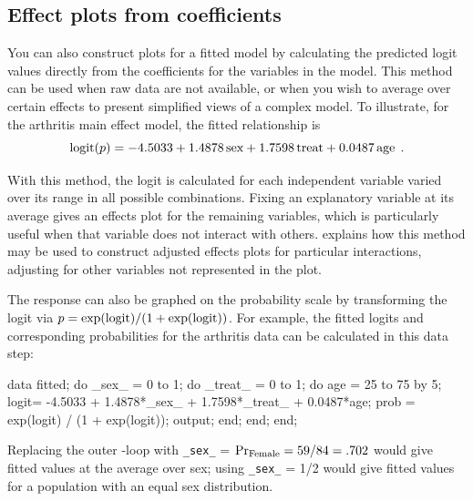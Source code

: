 \subsection{Effect plots from coefficients}\label{sec:logistic-effplot}
You can also construct plots for a fitted model
by calculating the predicted logit values directly from
the coefficients for the variables in the model.
This method can be used when raw data are not available, or when you
wish to average over certain effects to present simplified views of
a complex model.
To illustrate, for the arthritis
main effect model, the fitted relationship is
\begin{equation*}
  \logit ( p )  =
  - 4.5033  +
  1.4878 \,  \mbox{sex}   +
  1.7598 \,  \mbox{treat}  +
  0.0487 \,  \mbox{age}
  \period
\end{equation*}

With this method, the logit is calculated for each independent variable varied over its
range in all possible combinations.
Fixing an explanatory variable at its average gives an
effects plot for the remaining variables, which is particularly
useful when that
variable does not interact with others.
\citet{Fox:87} explains how this method may be used to construct adjusted
effects plots for particular interactions, adjusting for other
variables not represented in the plot.

The response can also be graphed on the probability scale by
transforming the logit via \(p = \exp(\logit) / ( 1  +  \exp(\logit) )\).  For example, the fitted logits and corresponding
probabilities for the arthritis data can be calculated in this data step:

\begin{listing}
data fitted;
  do _sex_ = 0 to 1;
     do _treat_ = 0 to 1;
        do age = 25 to 75 by 5;
           logit= -4.5033 + 1.4878*_sex_ + 1.7598*_treat_ + 0.0487*age;
           prob = exp(logit) / (1 + exp(logit));
           output;
           end;
        end;
     end;
\end{listing}
Replacing the outer -loop with \verb|_sex_| = $\Pr_{\mbox{\scriptsize Female}} = 59/84 = .702$
would give fitted values at the average over sex; using \verb|_sex_| = 1/2
would give fitted values for a population with an equal sex distribution.

